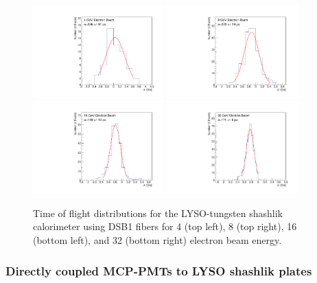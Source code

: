 \begin{figure}[H] \centering
\includegraphics[width=0.45\textwidth]{figs/timing/TOF_ShashlikDSB1Fiber_Electron_4GeV} 
\includegraphics[width=0.45\textwidth]{figs/timing/TOF_ShashlikDSB1Fiber_Electron_8GeV} \\
\includegraphics[width=0.45\textwidth]{figs/timing/TOF_ShashlikDSB1Fiber_Electron_16GeV} 
\includegraphics[width=0.45\textwidth]{figs/timing/TOF_ShashlikDSB1Fiber_Electron_32GeV} 
\caption{Time of flight distributions for the LYSO-tungsten shashlik calorimeter
using DSB1 fibers for 4 \GeV (top left), 8 \GeV (top right), 16 \GeV (bottom left), and 32 \GeV (bottom right) electron beam energy.} 
\label{fig:ShashlikFiberTOF}
\end{figure}


\subsubsection{Directly coupled MCP-PMTs to LYSO shashlik plates}

